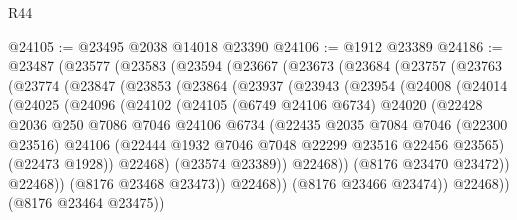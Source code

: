 \begin{lexlean}{R44}
\begin{coremodule}
{@24105 := @23495 @2038 @14018 @23390
@24106 := @1912 @23389
@24186 := @23487
    (@23577
      (@23583
        (@23594
          (@23667
            (@23673
              (@23684
                (@23757
                  (@23763
                    (@23774
                      (@23847
                        (@23853
                          (@23864
                            (@23937
                              (@23943
                                (@23954
                                  (@24008
                                    (@24014
                                      (@24025
                                        (@24096
                                          (@24102
                                            (@24105
                                              (@6749 @24106 @6734)
                                              @24020
                                              (@22428
                                                @2036
                                                @250
                                                @7086
                                                @7046
                                                @24106
                                                @6734
                                                (@22435
                                                  @2035
                                                  @7084
                                                  @7046
                                                  (@22300 @23516)
                                                  @24106
                                                  (@22444
                                                    @1932
                                                    @7046
                                                    @7048
                                                    @22299
                                                    @23516
                                                    @22456
                                                    @23565)
                                                  (@22473 @1928))
                                                @22468)
                                              (@23574 @23389))
                                            @22468))
                                        (@8176 @23470 @23472))
                                      @22468))
                                  (@8176 @23468 @23473))
                                @22468))
                            (@8176 @23466 @23474))
                          @22468))
                      (@8176 @23464 @23475))
}
\end{coremodule}
\end{lexlean}
